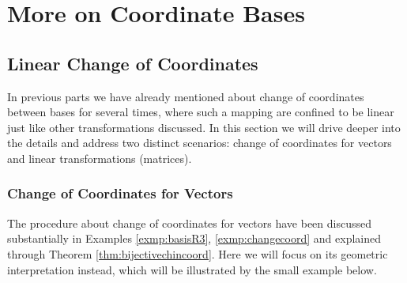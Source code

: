 \section{More on Coordinate Bases}

\subsection{Linear Change of Coordinates}

In previous parts we have already mentioned about change of coordinates between bases for several times, where such a mapping are confined to be linear just like other transformations discussed. In this section we will drive deeper into the details and address two distinct scenarios: change of coordinates for vectors and linear transformations (matrices).

\subsubsection{Change of Coordinates for Vectors}
The procedure about change of coordinates for vectors have been discussed substantially in Examples \ref{exmp:basisR3}, \ref{exmp:changecoord} and explained through Theorem \ref{thm:bijectivechincoord}. Here we will focus on its geometric interpretation instead, which will be illustrated by the small example below.

